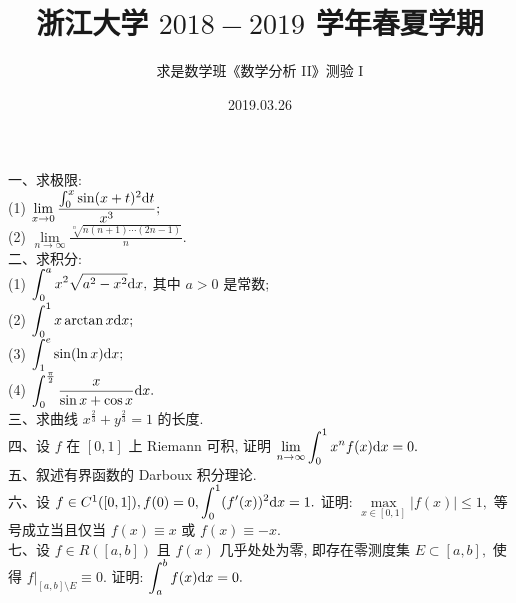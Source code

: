 \documentclass[UTF8]{ctexart}
\title{\LARGE \textbf{浙江大学 $2018-2019$ 学年春夏学期}}
\author{求是数学班《数学分析 II》测验 I}
\date{2019.03.26}
\begin{document}
\maketitle
一、求极限:
\\

(1) $\lim \limits_{x \rightarrow 0} \displaystyle \frac{\int_{0}^{x}\sin (x+t)^2 {\rm d}t}{x^3};$
\\

(2) $\lim \limits_{n\rightarrow\infty} \displaystyle \frac{\sqrt[n]{n(n+1)\cdots(2n-1)}}{n}.$
\\

二、求积分:
\\

(1) $\displaystyle \int_{0}^{a}x^2\sqrt{a^2-x^2}{\rm d}x,$ 其中 $a>0$ 是常数;
\\

(2) $\displaystyle \int_{0}^{1}x\arctan x{\rm d}x;$
\\

(3) $\displaystyle \int_{1}^{e}\sin(\ln x){\rm d}x;$
\\

(4) $\displaystyle \int_{0}^{\frac{\pi}{2}}\displaystyle \frac{x}{\sin x +\cos x}{\rm d}x.$
\\

三、求曲线 $x^{\frac{2}{3}}+y^{\frac{2}{3}}=1$ 的长度.
\\

四、设 $f$ 在 $[0,1]$ 上 Riemann 可积, 证明 $\lim \limits_{n\rightarrow\infty}\displaystyle \int_{0}^{1}x^nf(x){\rm d}x=0.$
\\

五、叙述有界函数的 Darboux 积分理论.
\\

六、设 $f\in C^1([0,1]), f(0)=0,\displaystyle \int_{0}^{1}(f'(x))^2{\rm d}x=1.$ 证明: $\max \limits_{x \in [0,1]}|f(x)|\leq 1,$ 等号成立当且仅当 $f(x)\equiv x$ 或 $f(x)\equiv -x.$
\\

七、设 $f \in R([a,b])$ 且 $f(x)$ 几乎处处为零, 即存在零测度集 $E \subset [a,b],$ 使得 $f|_{[a,b]\setminus E}\equiv0.$ 证明: $\displaystyle \int_{a}^{b}f(x){\rm d}x=0.$
\end{document}
